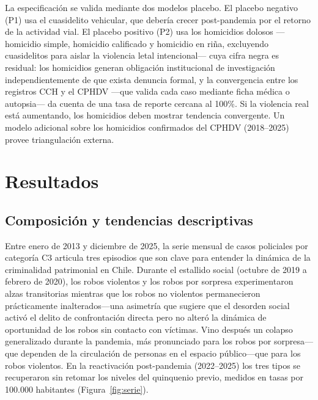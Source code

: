 \documentclass[12pt,a4paper]{article}
\begin{document}
La especificaci\'on se valida mediante dos modelos placebo. El placebo negativo (P1)
usa el cuasidelito vehicular, que deber\'ia crecer post-pandemia por el
retorno de la actividad vial. El placebo positivo (P2) usa los homicidios dolosos ---homicidio simple, homicidio calificado y homicidio en ri\~na, excluyendo cuasidelitos para aislar la violencia letal intencional--- cuya cifra negra es residual: los homicidios generan obligaci\'on institucional de investigaci\'on independientemente de que exista denuncia formal, y la convergencia entre los registros CCH y el CPHDV ---que valida cada caso mediante ficha m\'edica o autopsia--- da cuenta de una tasa de reporte cercana al 100\%. Si la violencia real est\'a aumentando, los homicidios deben mostrar tendencia convergente. Un modelo
adicional sobre los homicidios confirmados del CPHDV (2018--2025) provee triangulaci\'on
externa.


\section{Resultados}
\label{sec:resultados}

\subsection{Composici\'on y tendencias descriptivas}
\label{sub:descriptivo}

Entre enero de 2013 y diciembre de 2025, la serie mensual de casos policiales por
categor\'ia C3 articula tres episodios que son clave para entender la din\'amica de
la criminalidad patrimonial en Chile. Durante el estallido social (octubre de 2019 a
febrero de 2020), los robos violentos y los robos por sorpresa experimentaron alzas
transitorias mientras que los robos no violentos permanecieron pr\'acticamente
inalterados---una asimetr\'ia que sugiere que el desorden social activ\'o el delito
de confrontaci\'on directa pero no alter\'o la din\'amica de oportunidad de los robos
sin contacto con v\'ictimas. Vino despu\'es un colapso generalizado durante la
pandemia, m\'as pronunciado para los robos por sorpresa---que dependen de la
circulaci\'on de personas en el espacio p\'ublico---que para los robos violentos. En
la reactivaci\'on post-pandemia (2022--2025) los tres tipos se recuperaron sin retomar
los niveles del quinquenio previo, medidos en tasas por 100.000 habitantes
(Figura~\ref{fig:serie}).
\end{document}
